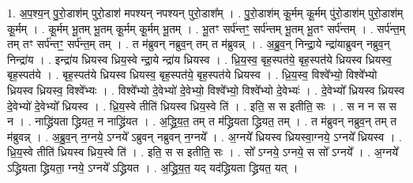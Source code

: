 \documentclass[17pt]{extarticle}
\begin{document}
1. अ॒प॒श्य॒न् पु॒रो॒डाश॑म् पुरो॒डाश॑ मपश्यन् नपश्यन् पुरो॒डाश᳚म् । . पु॒रो॒डाश॑म् कू॒र्मम् कू॒र्मम् पु॑रो॒डाश॑म् पुरो॒डाश॑म् कू॒र्मम् । . कू॒र्मम् भू॒तम् भू॒तम् कू॒र्मम् कू॒र्मम् भू॒तम् । . भू॒तꣳ सर्प॑न्तꣳ॒॒ सर्प॑न्तम् भू॒तम् भू॒तꣳ सर्प॑न्तम् । . सर्प॑न्त॒म् तम् तꣳ सर्प॑न्तꣳ॒॒ सर्प॑न्त॒म् तम् । . त म॑ब्रुवन् नब्रुव॒न् तम् त म॑ब्रुवन्न् । . अ॒ब्रु॒व॒न् निन्द्रा॒ये न्द्रा॑याब्रुवन् नब्रुव॒न् निन्द्रा॑य । . इन्द्रा॑य ध्रियस्व ध्रिय॒स्वे न्द्रा॒ये न्द्रा॑य ध्रियस्व । . ध्रि॒य॒स्व॒ बृह॒स्पत॑ये॒ बृह॒स्पत॑ये ध्रियस्व ध्रियस्व॒ बृह॒स्पत॑ये । . बृह॒स्पत॑ये ध्रियस्व ध्रियस्व॒ बृह॒स्पत॑ये॒ बृह॒स्पत॑ये ध्रियस्व । . ध्रि॒य॒स्व॒ विश्वे᳚भ्यो॒ विश्वे᳚भ्यो ध्रियस्व ध्रियस्व॒ विश्वे᳚भ्यः । . विश्वे᳚भ्यो दे॒वेभ्यो॑ दे॒वेभ्यो॒ विश्वे᳚भ्यो॒ विश्वे᳚भ्यो दे॒वेभ्यः॑ । . दे॒वेभ्यो᳚ ध्रियस्व ध्रियस्व दे॒वेभ्यो॑ दे॒वेभ्यो᳚ ध्रियस्व । . ध्रि॒य॒स्वे तीति॑ ध्रियस्व ध्रिय॒स्वे ति॑ । . इति॒ स स इतीति॒ सः । . स न न स स न । . नाद्ध्रि॑यता द्ध्रियत॒ न नाद्ध्रि॑यत । . अ॒द्ध्रि॒य॒त॒ तम् त म॑द्ध्रियता द्ध्रियत॒ तम् । . त म॑ब्रुवन् नब्रुव॒न् तम् त म॑ब्रुवन्न् । . अ॒ब्रु॒व॒न् न॒ग्नये॒ ऽग्नये᳚ ऽब्रुवन् नब्रुवन् न॒ग्नये᳚ । . अ॒ग्नये᳚ ध्रियस्व ध्रियस्वा॒ग्नये॒ ऽग्नये᳚ ध्रियस्व । . ध्रि॒य॒स्वे तीति॑ ध्रियस्व ध्रिय॒स्वे ति॑ । . इति॒ स स इतीति॒ सः । . सो᳚ ऽग्नये॒ ऽग्नये॒ स सो᳚ ऽग्नये᳚ । . अ॒ग्नये᳚ ऽद्ध्रियता द्ध्रियता॒ ग्नये॒ ऽग्नये᳚ ऽद्ध्रियत । . अ॒द्ध्रि॒य॒त॒ यद् यद॑द्ध्रियता द्ध्रियत॒ यत् । \newline
\end{document}
